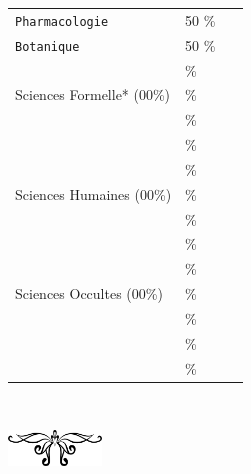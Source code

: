 \documentclass[11pt,twoside,a4paper]{article}
\begin{document}
\begin{multicols}{3}
{\begin{tabular}[c]{ p{4.00cm} p{1.00cm}|c|}
		\cline{3-3}
		\texttt{Pharmacologie}		& 50 \% & ~ \\ 		%
		\cline{3-3}
		\texttt{Botanique}		& 50 \% & ~ \\		%
		\cline{3-3}
		\dotfill			& \dotfill \% & ~ \\
		\cline{3-3}
		Sciences Formelle* (00\%)	& \dotfill \% & ~ \\
		\cline{3-3}
		\dotfill			& \dotfill \% & ~ \\
		\cline{3-3}
		\dotfill			& \dotfill \% & ~ \\
		\cline{3-3}
		\dotfill			& \dotfill \% & ~ \\
		\cline{3-3}
		Sciences Humaines (00\%)	& \dotfill \% & ~ \\
		\cline{3-3}
		\dotfill			& \dotfill \% & ~ \\
		\cline{3-3}
		\dotfill			& \dotfill \% & ~ \\
		\cline{3-3}
		\dotfill			& \dotfill \% & ~ \\
		\cline{3-3}
		Sciences Occultes (00\%)	& \dotfill \% & ~ \\
		\cline{3-3}
		\dotfill			& \dotfill \% & ~ \\
		\cline{3-3}
		\dotfill			& \dotfill \% & ~ \\
		\cline{3-3}
		\dotfill			& \dotfill \% & ~ \\
		\cline{3-3}
	\end{tabular} }~\\
	
	\begin{center}
		\includegraphics[width=2.50cm]{../../../../../imgGraphics/artsDecos/ornement06whiteBG.png}
	\end{center}
	
	\vfill
	\columnbreak
	

\end{multicols}
\end{document}
